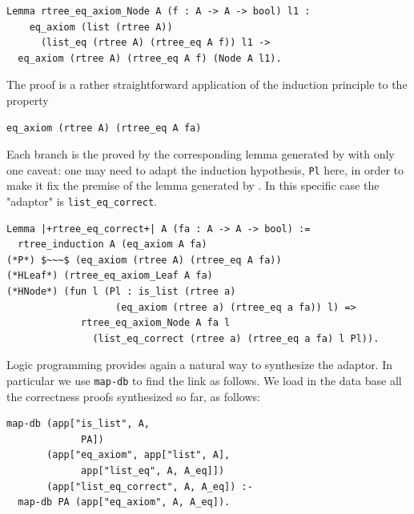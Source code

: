 \documentclass[sigplan,10pt,review]{acmart}\settopmatter{printfolios=true,printccs=false,printacmref=false}
\newcommand{\derive}[1]{\keys{#1}}
\begin{document}
\begin{minipage}{\textwidth}\begin{lstlisting}
Lemma rtree_eq_axiom_Node A (f : A -> A -> bool) l1 :
    eq_axiom (list (rtree A))
      (list_eq (rtree A) (rtree_eq A f)) l1 ->
  eq_axiom (rtree A) (rtree_eq A f) (Node A l1).
\end{lstlisting}\end{minipage}
       
\noindent
The proof is a rather straightforward application
of the induction principle to the property

\begin{minipage}{\textwidth}\begin{lstlisting}
eq_axiom (rtree A) (rtree_eq A fa)
\end{lstlisting}\end{minipage}

\noindent
Each branch is the proved by the corresponding
lemma generated by \derive{eqK} with only one caveat:
one may need to adapt the induction hypothesis, 
\lstinline+Pl+ here, in order to make it fix the premise
of the lemma generated by \derive{eqK}. In this specific
case the "adaptor" is \lstinline+list_eq_correct+.

\begin{minipage}{\textwidth}\begin{lstlisting}
Lemma |+rtree_eq_correct+| A (fa : A -> A -> bool) :=
  rtree_induction A (eq_axiom A fa)
(*P*) $~~~$ (eq_axiom (rtree A) (rtree_eq A fa))
(*HLeaf*) (rtree_eq_axiom_Leaf A fa)
(*HNode*) (fun l (Pl : is_list (rtree a)
                   (eq_axiom (rtree a) (rtree_eq a fa)) l) =>
             rtree_eq_axiom_Node A fa l
               (list_eq_correct (rtree a) (rtree_eq a fa) l Pl)).
\end{lstlisting}\end{minipage}

Logic programming provides again a natural way to synthesize
the adaptor. In particular we use \lstinline+map-db+ 
to find the link as follows. We load in the data base
all the correctness proofs synthesized so far, as follows:

\begin{minipage}{\textwidth}\begin{lstlisting}[]
map-db (app["is_list", A,
             PA])
       (app["eq_axiom", app["list", A],
             app["list_eq", A, A_eq]])
       (app["list_eq_correct", A, A_eq]) :-
  map-db PA (app["eq_axiom", A, A_eq]).
\end{lstlisting}\end{minipage}
\end{document}
